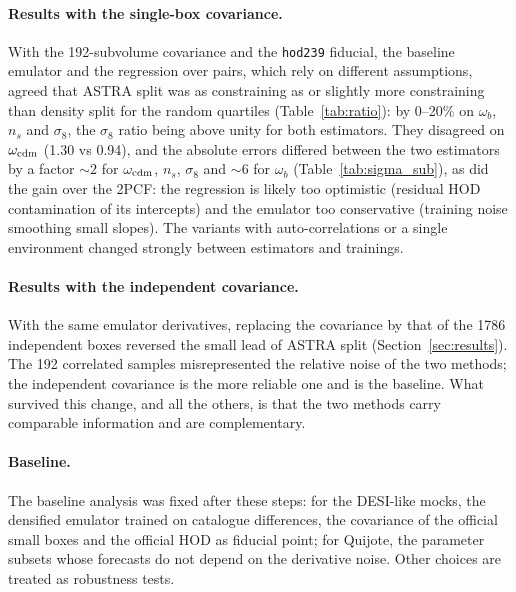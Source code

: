 \documentclass[11pt,twocolumn]{article}
\begin{document}
\paragraph{Results with the single-box covariance.} With the 192-subvolume covariance and the \texttt{hod239} fiducial, the baseline emulator and the regression over pairs, which rely on different assumptions, agreed that ASTRA split was as constraining as or slightly more constraining than density split for the random quartiles (Table~\ref{tab:ratio}): by 0--20\% on $\omega_b$, $n_s$ and $\sigma_8$, the $\sigma_8$ ratio being above unity for both estimators. They disagreed on $\omega_{\rm cdm}$ (1.30 vs 0.94), and the absolute errors differed between the two estimators by a factor $\sim2$ for $\omega_{\rm cdm}$, $n_s$, $\sigma_8$ and $\sim6$ for $\omega_b$ (Table~\ref{tab:sigma_sub}), as did the gain over the 2PCF: the regression is likely too optimistic (residual HOD contamination of its intercepts) and the emulator too conservative (training noise smoothing small slopes). The variants with auto-correlations or a single environment changed strongly between estimators and trainings.

\paragraph{Results with the independent covariance.} With the same emulator derivatives, replacing the covariance by that of the 1786 independent boxes reversed the small lead of ASTRA split (Section~\ref{sec:results}). The 192 correlated samples misrepresented the relative noise of the two methods; the independent covariance is the more reliable one and is the baseline. What survived this change, and all the others, is that the two methods carry comparable information and are complementary.

\paragraph{Baseline.} The baseline analysis was fixed after these steps: for the DESI-like mocks, the densified emulator trained on catalogue differences, the covariance of the official small boxes and the official HOD as fiducial point; for Quijote, the parameter subsets whose forecasts do not depend on the derivative noise. Other choices are treated as robustness tests.
\end{document}
